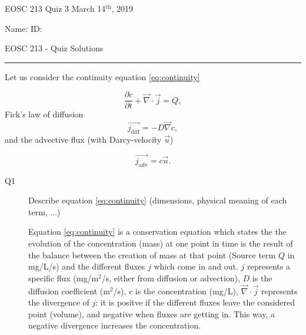 \documentclass{article}
\newcommand{\ans}[1]{\textcolor{dark-green}{#1}}
\begin{document}
\pagestyle{first}


\large{EOSC 213 Quiz 3} \hspace{10cm} \large{March 14$^{\textrm{th}}$, 2019}

\large{Name: } \hspace{12cm} \large{ID: }
\begin{center}
\Huge{EOSC 213 - Quiz Solutions}
\end{center}

\rule{\textwidth}{1pt}



Let us consider the continuity equation \ref{eq:continuity}

\begin{equation}
\frac{\partial c}{\partial t} + \overrightarrow{\nabla} \cdot \overrightarrow{j} = Q, \label{eq:continuity}
\end{equation} Fick's law of diffusion
\begin{equation}
\overrightarrow{j_{\mathrm{diff}}} = - D \overrightarrow{\nabla} c, \label{eq:fick}
\end{equation} and the advective flux (with Darcy-velocity $\overrightarrow{u}$)

\begin{equation}
\overrightarrow{j_{\mathrm{adv}}} = c \overrightarrow{u} . \label{eq:adv}
\end{equation}
\begin{description}
\item [Q1] Describe equation \ref{eq:continuity} (dimensions, physical meaning of each term, ...) 

\ans{Equation \ref{eq:continuity} is a conservation equation which states the the evolution of the concentration (mass) at one point in time is the result of the balance between the creation of mass at that point (Source term $Q$ in mg/L/s) and the different fluxes $j$ which come in and out. $j$ represents a specific flux (mg/m$^2$/s, either from diffusion or advection), $D$ is the diffusion coefficient (m$^2$/s), $c$ is the concentration (mg/L), $\overrightarrow{\nabla} \cdot \overrightarrow{j}$ represents the divergence of $j$: it is positve if the different fluxes leave the considered point (volume), and negative when fluxes are getting in. This way, a negative divergence increases the concentration.}

\end{description}
\end{document}
